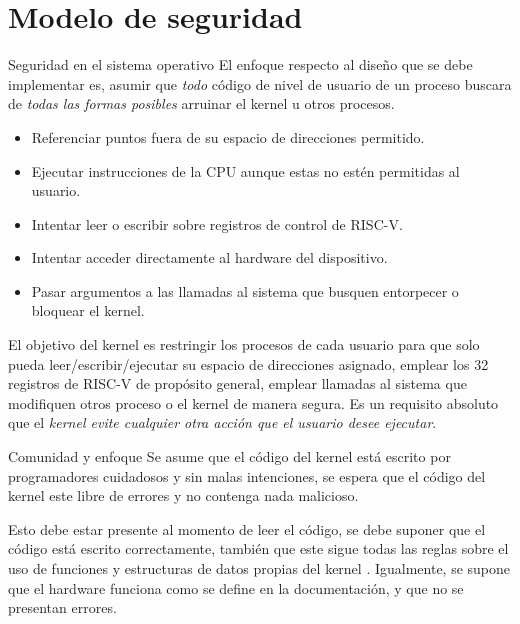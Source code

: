 \documentclass{libs/ufc_format}
\begin{document}
\section{Modelo de seguridad}
\begin{frame}{Seguridad en el sistema operativo}
    El enfoque respecto al diseño que se debe implementar es, asumir que \emph{todo} código de nivel de usuario de un proceso buscara de \emph{todas las formas posibles} arruinar el kernel u otros procesos.

    \vspace{0.3cm}

    \begin{itemize}
        \item Referenciar puntos fuera de su espacio de direcciones permitido.
        \item Ejecutar instrucciones de la CPU aunque estas no estén permitidas al usuario.
        \item Intentar leer o escribir sobre registros de control de RISC-V.
        \item Intentar acceder directamente al hardware del dispositivo.
        \item Pasar argumentos a las llamadas al sistema que busquen entorpecer o bloquear el kernel.
    \end{itemize}
\end{frame}
\begin{frame}{}
    El objetivo del kernel es restringir los procesos de cada usuario para que solo pueda leer/escribir/ejecutar su espacio de direcciones asignado, emplear los 32 registros de RISC-V de propósito general, emplear llamadas al sistema que modifiquen otros proceso o el kernel de manera segura. Es un requisito absoluto que el \emph{kernel evite cualquier otra acción que el usuario desee ejecutar}. \cite{xv6_book}
\end{frame}
\begin{frame}{Comunidad y enfoque}
    Se asume que el código del kernel está escrito por programadores cuidadosos y sin malas intenciones, se espera que el código del kernel este libre de errores y no contenga nada malicioso. \cite{xv6_book} \newline

    \vspace{0.3cm}

    Esto debe estar presente al momento de leer el código, se debe suponer que el código está escrito correctamente, también que este sigue todas las reglas sobre el uso de funciones y estructuras de datos propias del kernel \cite{xv6_book}. Igualmente, se supone que el hardware funciona como se define en la documentación, y que no se presentan errores.
\end{frame}
\end{document}
